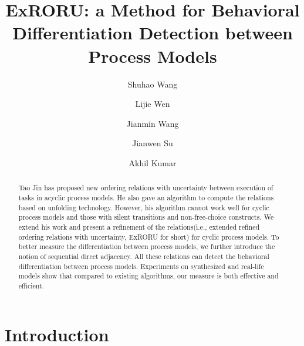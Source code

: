 \documentclass[dvips,...]{llncs}
\begin{document}
\frontmatter 
\pagestyle{headings}

\mainmatter
\title{ExRORU: a Method for Behavioral Differentiation Detection between Process Models}

\author[$1$]{Shuhao Wang}
\author[$1$]{Lijie Wen}
\author[$1$]{Jianmin Wang}
\author[$2$]{Jianwen Su}
\author[$3$]{Akhil Kumar}
\institute{}

\maketitle

\begin{abstract}
Tao Jin has proposed new ordering relations with uncertainty between execution of tasks in acyclic process models. He also gave an algorithm to compute the relations based on unfolding technology. However, his algorithm cannot work well for cyclic process models and those with silent transitions and non-free-choice constructs. We extend his work and present a refinement of the relations(i.e., extended refined ordering relations with uncertainty, ExRORU for short) for cyclic process models. To better measure the differentiation between process models, we further introduce the notion of sequential direct adjacency. All these relations can detect the behavioral differentiation between process models. Experiments on synthesized and real-life models show that compared to existing algorithms, our measure is both effective and efficient.
\end{abstract}

\section{Introduction}\label{sec:introduction}
\end{document}
